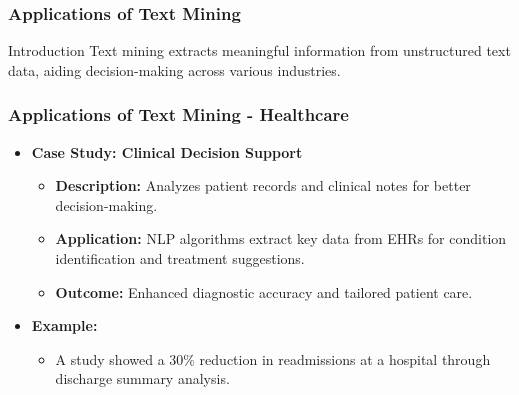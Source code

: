 \documentclass[aspectratio=169]{beamer}
\begin{document}
\begin{frame}[fragile]
    \frametitle{Applications of Text Mining}
    
    \begin{block}{Introduction}
        Text mining extracts meaningful information from unstructured text data, aiding decision-making across various industries.
    \end{block}
\end{frame}

\begin{frame}[fragile]
    \frametitle{Applications of Text Mining - Healthcare}
    
    \begin{itemize}
        \item \textbf{Case Study: Clinical Decision Support}
        \begin{itemize}
            \item \textbf{Description:} Analyzes patient records and clinical notes for better decision-making.
            \item \textbf{Application:} NLP algorithms extract key data from EHRs for condition identification and treatment suggestions.
            \item \textbf{Outcome:} Enhanced diagnostic accuracy and tailored patient care.
        \end{itemize}
        \item \textbf{Example:}
        \begin{itemize}
            \item A study showed a 30\% reduction in readmissions at a hospital through discharge summary analysis.
        \end{itemize}
    \end{itemize}
\end{frame}
\end{document}

